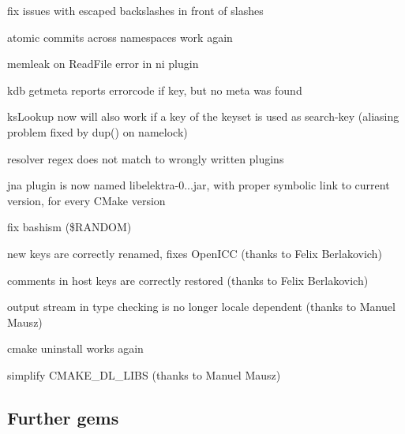 \begin{DoxyItemize}
\item fix issues with escaped backslashes in front of slashes
\item atomic commits across namespaces work again
\item memleak on Read\+File error in ni plugin
\item {\ttfamily kdb getmeta} reports errorcode if key, but no meta was found
\item {\ttfamily ks\+Lookup} now will also work if a key of the keyset is used as search-\/key (aliasing problem fixed by dup() on namelock)
\item resolver regex does not match to wrongly written plugins
\item jna plugin is now named libelektra-\/0...\+jar, with proper symbolic link to current version, for every C\+Make version
\item fix bashism ({\ttfamily \$\+R\+A\+N\+D\+OM})
\item new keys are correctly renamed, fixes Open\+I\+CC (thanks to Felix Berlakovich)
\item comments in host keys are correctly restored (thanks to Felix Berlakovich)
\item output stream in type checking is no longer locale dependent (thanks to Manuel Mausz)
\item cmake uninstall works again
\item simplify {\ttfamily C\+M\+A\+K\+E\+\_\+\+D\+L\+\_\+\+L\+I\+BS} (thanks to Manuel Mausz)
\end{DoxyItemize}

\subsection*{Further gems}


